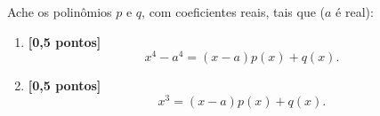 Ache os polinômios $p$ e $q$, com coeficientes reais, tais que ($a$ é real):
\begin{enumerate}
	\item{\bf [0,5 pontos]}
	\[
		x^4-a^4=(x-a)p(x)+q(x).
	\]
	\item{\bf [0,5 pontos]}
	\[
		x^3=(x-a)p(x)+q(x).
	\]
\end{enumerate}
